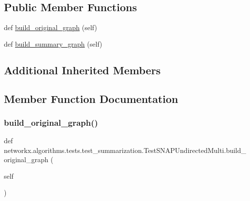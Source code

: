 \subsection*{Public Member Functions}
\begin{DoxyCompactItemize}
\item 
def \hyperlink{classnetworkx_1_1algorithms_1_1tests_1_1test__summarization_1_1TestSNAPUndirectedMulti_aa436fc6d812e67657d6afea2d4fbbf33}{build\+\_\+original\+\_\+graph} (self)
\item 
def \hyperlink{classnetworkx_1_1algorithms_1_1tests_1_1test__summarization_1_1TestSNAPUndirectedMulti_aa86564d8713e45c74294ce61229ee814}{build\+\_\+summary\+\_\+graph} (self)
\end{DoxyCompactItemize}
\subsection*{Additional Inherited Members}


\subsection{Member Function Documentation}
\mbox{\label{classnetworkx_1_1algorithms_1_1tests_1_1test__summarization_1_1TestSNAPUndirectedMulti_aa436fc6d812e67657d6afea2d4fbbf33}} 
\subsubsection{\texorpdfstring{build\+\_\+original\+\_\+graph()}{build\_original\_graph()}}
{\footnotesize\ttfamily def networkx.\+algorithms.\+tests.\+test\+\_\+summarization.\+Test\+S\+N\+A\+P\+Undirected\+Multi.\+build\+\_\+original\+\_\+graph (\begin{DoxyParamCaption}\item[{}]{self }\end{DoxyParamCaption})}

